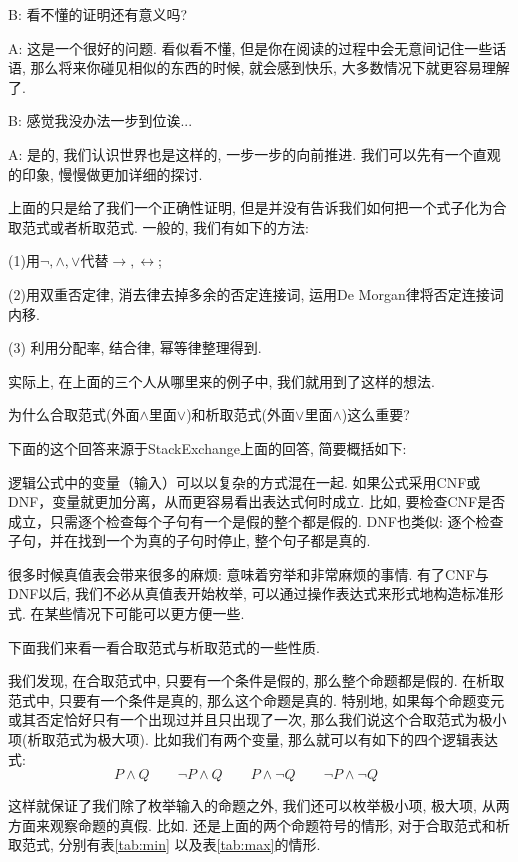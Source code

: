 \begin{dialogue}

B: 看不懂的证明还有意义吗?

A: 这是一个很好的问题. 看似看不懂, 但是你在阅读的过程中会无意间记住一些话语, 那么将来你碰见相似的东西的时候, 就会感到快乐, 大多数情况下就更容易理解了. 

B: 感觉我没办法一步到位诶...

A: 是的, 我们认识世界也是这样的, 一步一步的向前推进. 我们可以先有一个直观的印象, 慢慢做更加详细的探讨. 		
\end{dialogue}


上面的只是给了我们一个正确性证明, 但是并没有告诉我们如何把一个式子化为合取范式或者析取范式. 一般的, 我们有如下的方法: 

(1)用$\lnot,\land,\lor$代替$\to,\leftrightarrow$;

(2)用双重否定律, 消去律去掉多余的否定连接词, 运用De Morgan律将否定连接词内移. 

(3) 利用分配率, 结合律, 幂等律整理得到. 

实际上, 在上面的三个人从哪里来的例子中, 我们就用到了这样的想法. 


\begin{bonus}
	为什么合取范式(外面$\land$里面$\lor$)和析取范式(外面$\lor$里面$\land$)这么重要? 
\end{bonus}

下面的这个回答来源于StackExchange上面的回答\cite{why-important-cnf-dnf}, 简要概括如下:

逻辑公式中的变量（输入）可以以复杂的方式混在一起. 如果公式采用CNF或DNF，变量就更加分离，从而更容易看出表达式何时成立. 比如, 要检查CNF是否成立，只需逐个检查每个子句有一个是假的整个都是假的. DNF也类似: 逐个检查子句，并在找到一个为真的子句时停止, 整个句子都是真的. 

很多时候真值表会带来很多的麻烦: 意味着穷举和非常麻烦的事情. 有了CNF与DNF以后, 我们不必从真值表开始枚举, 可以通过操作表达式来形式地构造标准形式. 在某些情况下可能可以更方便一些.

下面我们来看一看合取范式与析取范式的一些性质. 

我们发现, 在合取范式中, 只要有一个条件是假的, 那么整个命题都是假的. 在析取范式中, 只要有一个条件是真的, 那么这个命题是真的. 特别地, 如果每个命题变元或其否定恰好只有一个出现过并且只出现了一次, 那么我们说这个合取范式为极小项(析取范式为极大项). 比如我们有两个变量, 那么就可以有如下的四个逻辑表达式: 
$$
P\land Q \qquad
 \lnot P \land Q \qquad
  P \land \lnot Q \qquad
   \lnot P \land \lnot Q \qquad
$$

这样就保证了我们除了枚举输入的命题之外, 我们还可以枚举极小项, 极大项, 从两方面来观察命题的真假. 比如. 还是上面的两个命题符号的情形, 对于合取范式和析取范式, 分别有表\ref{tab:min} 以及表\ref{tab:max}的情形. 

